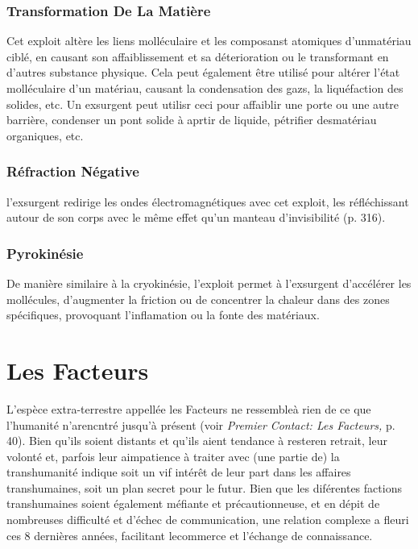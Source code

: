 \subsubsection{Transformation De La Matière} 

Cet exploit altère les liens molléculaire et les composanst atomiques d'unmatériau ciblé, en causant son affaiblissement et sa déterioration ou le transformant en d'autres substance physique. Cela peut également être utilisé pour altérer l'état molléculaire d'un matériau, causant la condensation des gazs, la liquéfaction des solides, etc. Un exsurgent peut utilisr ceci pour affaiblir une porte ou une autre barrière, condenser un pont solide à aprtir de liquide, pétrifier desmatériau organiques, etc. 

\subsubsection{Réfraction Négative} 

l'exsurgent redirige les ondes électromagnétiques avec cet exploit, les réfléchissant autour de son corps avec le même effet qu'un manteau d'invisibilité (p. 316). 

\subsubsection{Pyrokinésie} 

De manière similaire à la cryokinésie, l'exploit permet à l'exsurgent d'accélérer les mollécules, d'augmenter la friction ou de concentrer la chaleur dans des zones spécifiques, provoquant l'inflamation ou la fonte des matériaux. 

\section{Les Facteurs } 

L'espèce extra-terrestre appellée les Facteurs ne ressembleà rien de ce que l'humanité n'arencntré jusqu'à présent (voir \textit{Premier} \textit{Contact: Les Facteurs,} p. 40). Bien qu'ils soient distants et qu'ils aient tendance à resteren retrait, leur volonté et, parfois leur aimpatience à traiter avec (une partie de) la transhumanité indique soit un vif intérêt de leur part dans les affaires transhumaines, soit un plan secret pour le futur. Bien que les diférentes factions transhumaines soient également méfiante et précautionneuse, et en dépit de nombreuses difficulté et d'échec de communication, une relation complexe a fleuri ces 8 dernières années, facilitant lecommerce et l'échange de connaissance. 

